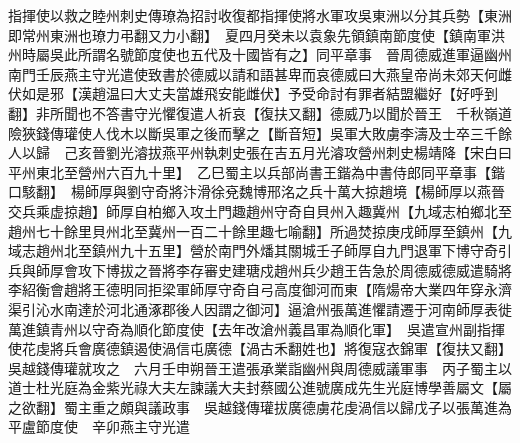 指揮使以救之睦州刺史傳璙為招討收復都指揮使將水軍攻吳東洲以分其兵勢【東洲即常州東洲也璙力弔翻又力小翻】　夏四月癸未以袁象先領鎮南節度使【鎮南軍洪州時屬吳此所謂名號節度使也五代及十國皆有之】同平章事　晉周德威進軍逼幽州南門壬辰燕主守光遣使致書於德威以請和語甚卑而哀德威曰大燕皇帝尚未郊天何雌伏如是邪【漢趙温曰大丈夫當雄飛安能雌伏】予受命討有罪者結盟繼好【好呼到翻】非所聞也不答書守光懼復遣人祈哀【復扶又翻】德威乃以聞於晉王　千秋嶺道險狹錢傳瓘使人伐木以斷吳軍之後而擊之【斷音短】吳軍大敗虜李濤及士卒三千餘人以歸　己亥晉劉光濬拔燕平州執刺史張在吉五月光濬攻營州刺史楊靖降【宋白曰平州東北至營州六百九十里】　乙巳蜀主以兵部尚書王鍇為中書侍郎同平章事【鍇口駭翻】　楊師厚與劉守奇將汴滑徐兗魏博邢洺之兵十萬大掠趙境【楊師厚以燕晉交兵乘虚掠趙】師厚自柏鄉入攻土門趣趙州守奇自貝州入趣冀州【九域志柏鄉北至趙州七十餘里貝州北至冀州一百二十餘里趣七喻翻】所過焚掠庚戌師厚至鎮州【九域志趙州北至鎮州九十五里】營於南門外燔其關城壬子師厚自九門退軍下博守奇引兵與師厚會攻下博拔之晉將李存審史建瑭戍趙州兵少趙王告急於周德威德威遣騎將李紹衡會趙將王德明同拒梁軍師厚守奇自弓高度御河而東【隋煬帝大業四年穿永濟渠引沁水南達於河北通涿郡後人因謂之御河】逼滄州張萬進懼請遷于河南師厚表徙萬進鎮青州以守奇為順化節度使【去年改滄州義昌軍為順化軍】　吳遣宣州副指揮使花虔將兵會廣德鎮遏使渦信屯廣德【渦古禾翻姓也】將復寇衣錦軍【復扶又翻】吳越錢傳瓘就攻之　六月壬申朔晉王遣張承業詣幽州與周德威議軍事　丙子蜀主以道士杜光庭為金紫光祿大夫左諫議大夫封蔡國公進號廣成先生光庭博學善屬文【屬之欲翻】蜀主重之頗與議政事　吳越錢傳瓘拔廣德虜花虔渦信以歸戊子以張萬進為平盧節度使　辛卯燕主守光遣

